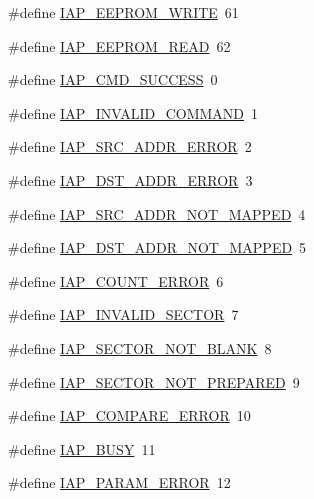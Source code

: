 \begin{DoxyCompactItemize}
\#define \hyperlink{group__COMMON__IAP_ga76ebaaa7cd2a015246d1a44e3a0cc369}{I\-A\-P\-\_\-\-E\-E\-P\-R\-O\-M\-\_\-\-W\-R\-I\-T\-E}~61
\item 
\#define \hyperlink{group__COMMON__IAP_ga34d721b0a3ff4caf7b847c9d85fe73a0}{I\-A\-P\-\_\-\-E\-E\-P\-R\-O\-M\-\_\-\-R\-E\-A\-D}~62
\item 
\#define \hyperlink{group__COMMON__IAP_ga6855b3bb97689d746eff1f27dde58fc5}{I\-A\-P\-\_\-\-C\-M\-D\-\_\-\-S\-U\-C\-C\-E\-S\-S}~0
\item 
\#define \hyperlink{group__COMMON__IAP_ga78fcc8d4b3835576a272431915e39eb7}{I\-A\-P\-\_\-\-I\-N\-V\-A\-L\-I\-D\-\_\-\-C\-O\-M\-M\-A\-N\-D}~1
\item 
\#define \hyperlink{group__COMMON__IAP_gaad19f900fbc28ee51d3e0138a88a446b}{I\-A\-P\-\_\-\-S\-R\-C\-\_\-\-A\-D\-D\-R\-\_\-\-E\-R\-R\-O\-R}~2
\item 
\#define \hyperlink{group__COMMON__IAP_ga72a13c4c7132aa3da476fc0907cb2a08}{I\-A\-P\-\_\-\-D\-S\-T\-\_\-\-A\-D\-D\-R\-\_\-\-E\-R\-R\-O\-R}~3
\item 
\#define \hyperlink{group__COMMON__IAP_ga8d15cbc501933748afbe786c587e74f9}{I\-A\-P\-\_\-\-S\-R\-C\-\_\-\-A\-D\-D\-R\-\_\-\-N\-O\-T\-\_\-\-M\-A\-P\-P\-E\-D}~4
\item 
\#define \hyperlink{group__COMMON__IAP_gacd5a7fb6c783f5d435e594170757d1d4}{I\-A\-P\-\_\-\-D\-S\-T\-\_\-\-A\-D\-D\-R\-\_\-\-N\-O\-T\-\_\-\-M\-A\-P\-P\-E\-D}~5
\item 
\#define \hyperlink{group__COMMON__IAP_ga719488ff2abf2f325b73a10b20403813}{I\-A\-P\-\_\-\-C\-O\-U\-N\-T\-\_\-\-E\-R\-R\-O\-R}~6
\item 
\#define \hyperlink{group__COMMON__IAP_gab3af925b968fb59823d08d77261aebf7}{I\-A\-P\-\_\-\-I\-N\-V\-A\-L\-I\-D\-\_\-\-S\-E\-C\-T\-O\-R}~7
\item 
\#define \hyperlink{group__COMMON__IAP_ga19b046ec9c03aa0276a9cbe409eb3f04}{I\-A\-P\-\_\-\-S\-E\-C\-T\-O\-R\-\_\-\-N\-O\-T\-\_\-\-B\-L\-A\-N\-K}~8
\item 
\#define \hyperlink{group__COMMON__IAP_ga8600f9e930f1dee5d67a2bc11efcde63}{I\-A\-P\-\_\-\-S\-E\-C\-T\-O\-R\-\_\-\-N\-O\-T\-\_\-\-P\-R\-E\-P\-A\-R\-E\-D}~9
\item 
\#define \hyperlink{group__COMMON__IAP_gabeb57ce3d4009fdee1847f5494376c8d}{I\-A\-P\-\_\-\-C\-O\-M\-P\-A\-R\-E\-\_\-\-E\-R\-R\-O\-R}~10
\item 
\#define \hyperlink{group__COMMON__IAP_gaa4e308bc310bb68aa8409a6f830aee04}{I\-A\-P\-\_\-\-B\-U\-S\-Y}~11
\item 
\#define \hyperlink{group__COMMON__IAP_ga6bf1bec9cbb419f8006447171e9750b7}{I\-A\-P\-\_\-\-P\-A\-R\-A\-M\-\_\-\-E\-R\-R\-O\-R}~12

\end{DoxyCompactItemize}

